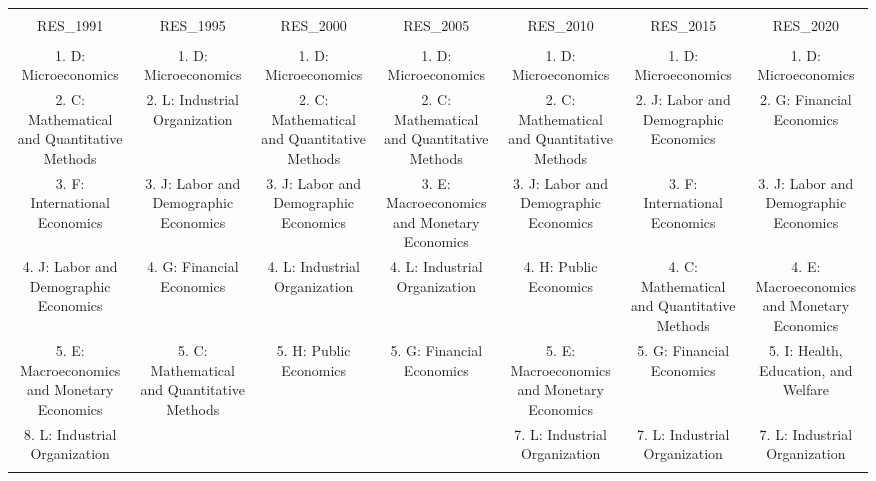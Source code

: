 
\begin{table}[!htbp] \centering 
  \caption{} 
  \label{} 
\begin{tabular}{@{\extracolsep{5pt}} ccccccc} 
\\[-1.8ex]\hline 
\hline \\[-1.8ex] 
RES\_1991 & RES\_1995 & RES\_2000 & RES\_2005 & RES\_2010 & RES\_2015 & RES\_2020 \\ 
\hline \\[-1.8ex] 
1. D: Microeconomics & 1. D: Microeconomics & 1. D: Microeconomics & 1. D: Microeconomics & 1. D: Microeconomics & 1. D: Microeconomics & 1. D: Microeconomics \\ 
2. C: Mathematical and Quantitative Methods & 2. L: Industrial Organization & 2. C: Mathematical and Quantitative Methods & 2. C: Mathematical and Quantitative Methods & 2. C: Mathematical and Quantitative Methods & 2. J: Labor and Demographic Economics & 2. G: Financial Economics \\ 
3. F: International Economics & 3. J: Labor and Demographic Economics & 3. J: Labor and Demographic Economics & 3. E: Macroeconomics and Monetary Economics & 3. J: Labor and Demographic Economics & 3. F: International Economics & 3. J: Labor and Demographic Economics \\ 
4. J: Labor and Demographic Economics & 4. G: Financial Economics & 4. L: Industrial Organization & 4. L: Industrial Organization & 4. H: Public Economics & 4. C: Mathematical and Quantitative Methods & 4. E: Macroeconomics and Monetary Economics \\ 
5. E: Macroeconomics and Monetary Economics & 5. C: Mathematical and Quantitative Methods & 5. H: Public Economics & 5. G: Financial Economics & 5. E: Macroeconomics and Monetary Economics & 5. G: Financial Economics & 5. I: Health, Education, and Welfare \\ 
8. L: Industrial Organization &  &  &  & 7. L: Industrial Organization & 7. L: Industrial Organization & 7. L: Industrial Organization \\ 
\hline \\[-1.8ex] 
\end{tabular} 
\end{table} 
